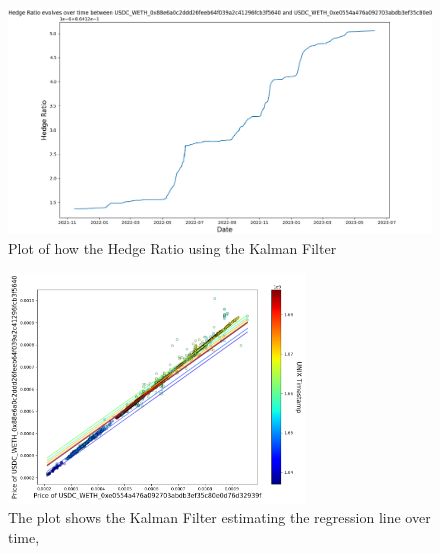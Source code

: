 \begin{figure}[!htb]
    \centering
    \includegraphics[width=\textwidth]{project/Images/Evolving_hedge_ratio_kf.png}
    \caption{Plot of how the Hedge Ratio using the Kalman Filter \label{fig:evolving_hedge_ratio_kf}}
\end{figure}
\vspace{-0.7cm}
\begin{figure}[!htb]
    \centering
    \includegraphics[width=0.7\textwidth]{project/Images/plots_1.png}
    \caption{The plot shows the Kalman Filter estimating the regression line over time, \label{fig:ratios_kf}}
\end{figure}

